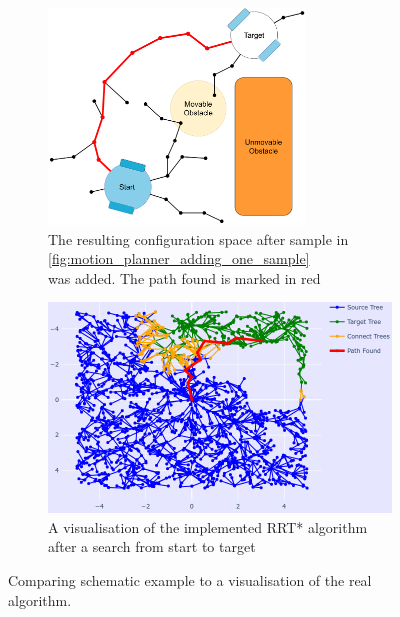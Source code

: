\begin{figure}[H]
    \centering
    \begin{subfigure}{.5\textwidth}
    \centering
    \includegraphics[width=0.75\textwidth]{figures/mp/7mp_path_found.drawio.png}
    \caption{The resulting configuration space after sample in \cref{fig:motion_planner_adding_one_sample}\\ was added. The path found is marked in red}
    \end{subfigure}%
    \begin{subfigure}{.5\textwidth}
    \hspace{-0.7cm}
    \includegraphics[width=1.1\textwidth]{figures/mp/mp_the_real_deal.png}
    \caption{A visualisation of the implemented \acs{RRT*} algorithm\\after a search from start to target}
    \end{subfigure}
    \label{fig:motion_planner_comparison}%
    \caption{Comparing schematic example to a visualisation of the real algorithm.}
\end{figure}

